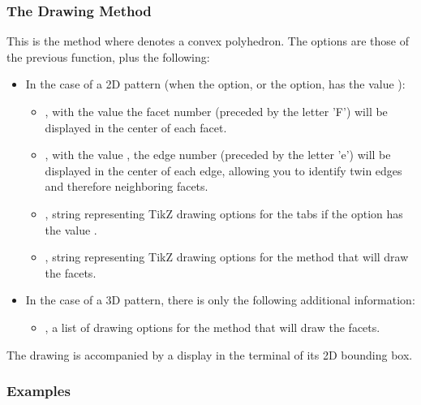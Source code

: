 \subsubsection{The Drawing Method}

This is the method  where  denotes a convex polyhedron. The options are those of the previous function, plus the following:

\begin{itemize}
    \item In the case of a 2D pattern (when the  option, or the  option, has the value \true):
    \begin{itemize}
        \item {}, with the value \true the facet number (preceded by the letter 'F') will be displayed in the center of each facet.

        \item {}, with the value \true, the edge number (preceded by the letter 'e') will be displayed in the center of each edge, allowing you to identify twin edges and therefore neighboring facets.

        \item {}, string representing TikZ drawing options for the tabs if the  option has the value \true.

        \item {}, string representing TikZ drawing options for the  method that will draw the facets. 
    \end{itemize}

    \item In the case of a 3D pattern, there is only the following additional information:
    \begin{itemize}
        \item {}, a list of drawing options for the  method that will draw the facets.
    \end{itemize}
\end{itemize}

The drawing is accompanied by a display in the terminal of its 2D bounding box.

    
\subsubsection{Examples}

